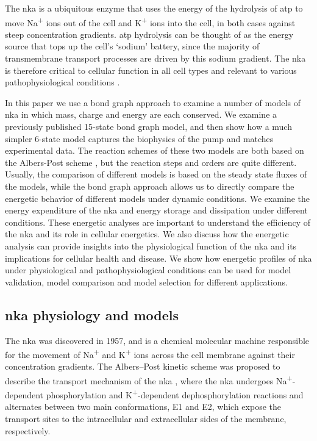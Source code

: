 \documentclass{biophys-new}
\begin{document}
The \gls{nka} is a ubiquitous enzyme that uses the energy of the hydrolysis of \gls{atp} to move Na\textsuperscript{+} ions out of the cell and K\textsuperscript{+} ions into the cell,
in both cases against steep concentration gradients. 
\Gls{atp} hydrolysis can be thought of as the energy source that tops up the cell's `sodium' battery,
since the majority of transmembrane transport processes are driven by this sodium gradient.
The \gls{nka} is therefore critical to cellular function in all cell types and relevant to various pathophysiological conditions \cite{suhail_na_2010}.

In this paper we use a bond graph approach to examine a number of models of \gls{nka} in which mass, charge and energy are each conserved.
We examine a previously published 15-state bond graph model,
and then show how a much simpler 6-state model captures the biophysics of the pump and matches experimental data.
The reaction schemes of these two models are both based on the Albers-Post scheme \cite{albers_role_1963,post_activation_1972}, but the reaction steps and orders are quite different. Usually, the comparison of different models is based on the steady state fluxes of the models, while the bond graph approach allows us to directly compare the energetic behavior of different models under dynamic conditions.
We examine the energy expenditure of the \Gls{nka} and energy storage and dissipation under different conditions.
These energetic analyses are important to understand the efficiency of the \gls{nka} and its role in cellular energetics.
We also discuss how the energetic analysis can provide insights into the physiological function of the \gls{nka} and its implications for cellular health and disease.
We show how energetic profiles of \gls{nka} under physiological and pathophysiological conditions can be used for model validation, model comparison and model selection for different applications.

\subsection*{\Gls{nka} physiology and models}

The \Gls{nka} was discovered in 1957\cite{skou_influence_1957},
and is a chemical molecular machine responsible for the movement of Na\textsuperscript{+} and K\textsuperscript{+} ions across the cell membrane against their concentration gradients.
The Albers–Post kinetic scheme \cite{albers_role_1963,post_activation_1972} was proposed to describe the transport mechanism of the \Gls{nka} \cite{apell_electrogenic_1989},
where the \Gls{nka} undergoes Na\textsuperscript{+}-dependent phosphorylation and K\textsuperscript{+}-dependent dephosphorylation reactions and alternates between two main conformations, 
\textrm{E1} and \textrm{E2}, which expose the transport sites to the intracellular and extracellular sides of the membrane, respectively.
\end{document}
